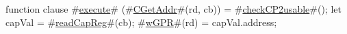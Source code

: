 function clause #\hyperref[zexecute]{execute}# (#\hyperref[zCGetAddr]{CGetAddr}#(rd, cb)) =
{
  #\hyperref[zcheckCP2usable]{checkCP2usable}#();
  let capVal = #\hyperref[zreadCapReg]{readCapReg}#(cb);
  #\hyperref[zwGPR]{wGPR}#(rd) = capVal.address;
}

